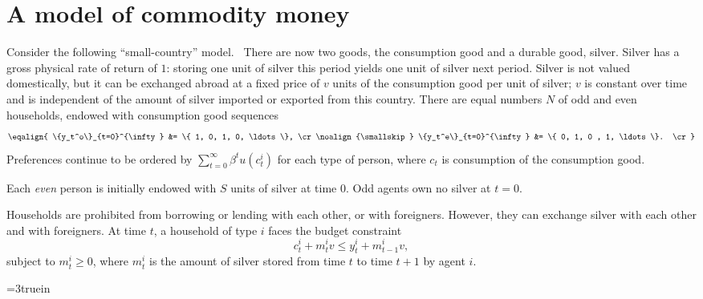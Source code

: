 \section{A model of commodity money}
Consider the following ``small-country'' model.
\
 There are now two goods, the consumption good and a durable good, silver.
Silver has a gross physical rate of return of $1$: storing one unit of silver
this period yields one unit of silver next period.  Silver is not valued
domestically, but it can be exchanged abroad at a fixed price of $v$ units of
the consumption good per unit of silver; $v$ is constant over time and is
independent of the amount of silver imported or exported from this country.
There are equal numbers $N$ of odd and even households, endowed
with consumption good sequences
$$\eqalign{ \{y_t^o\}_{t=0}^{\infty} &= \{ 1, 0, 1, 0, \ldots \}, \cr
\noalign{\smallskip}
            \{y_t^e\}_{t=0}^{\infty} &= \{ 0, 1, 0 , 1, \ldots \}. \cr }  $$
Preferences continue to be  ordered by $\sum_{t=0}^\infty \beta^t
u(c_t^i)$ for each type of person, where $c_t$ is consumption
of the consumption good.

   Each {\it even\/} person is initially endowed with $S$ units of
silver at time $0$. Odd agents own no silver at $t=0$.

 Households are prohibited from borrowing or lending with each other, or with
foreigners.  However, they can exchange silver with each other and with
foreigners.  At time $t$, a household of type $i$ faces the budget constraint
$$ c_t^i + m_t^i v \leq y_t^i + m_{t-1}^i v, $$
subject to $m_t^i \geq 0$, where $m_t^i$ is the amount of
silver stored from time $t$ to time $t+1$ by agent $i$.


\centerline{\epsfxsize=3truein}
\caption{Determination of equilibrium when $u'(v S) < \beta u'(c_0)$.  For
as long as it is feasible, the even agent sets $u'(c_{t+1}^e) /u'(c_t^e) = \beta$
by running down his silver holdings.  This implies that  $c_{t+1}^e < c_t^e$
during the run-down period.  Eventually, the even agent runs out of silver,
so that the tail of his allocation is $\{c_0, 1-c_0, c_0, 1-c_0, \ldots\}$,
determined as before.  The figure depicts how the spending of silver pushes the
agent onto lower  two-period budget sets.}
\endfigure

